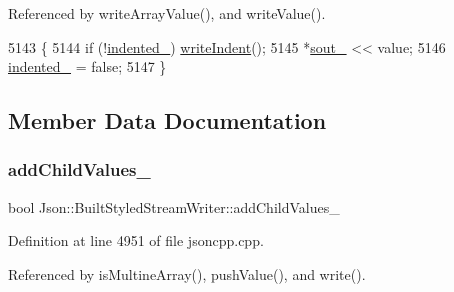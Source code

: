 Referenced by write\+Array\+Value(), and write\+Value().


\begin{DoxyCode}
5143                                                                          \{
5144   \textcolor{keywordflow}{if} (!\hyperlink{struct_json_1_1_built_styled_stream_writer_a6aa0ad023e623f600103631a6bca6d10}{indented\_}) \hyperlink{struct_json_1_1_built_styled_stream_writer_a2b38a3714d415c4bd3b4812897130f3d}{writeIndent}();
5145   *\hyperlink{class_json_1_1_stream_writer_a4f5603d4228a9fa46a42cb44e5234d9b}{sout\_} << value;
5146   \hyperlink{struct_json_1_1_built_styled_stream_writer_a6aa0ad023e623f600103631a6bca6d10}{indented\_} = \textcolor{keyword}{false};
5147 \}
\end{DoxyCode}


\subsection{Member Data Documentation}
\mbox{\label{struct_json_1_1_built_styled_stream_writer_abed9cc31da503b48798e7cea68c42e16}} 
\subsubsection{\texorpdfstring{add\+Child\+Values\+\_\+}{addChildValues\_}}
{\footnotesize\ttfamily bool Json\+::\+Built\+Styled\+Stream\+Writer\+::add\+Child\+Values\+\_\+\hspace{0.3cm}{\ttfamily [private]}}



Definition at line 4951 of file jsoncpp.\+cpp.



Referenced by is\+Multine\+Array(), push\+Value(), and write().

\mbox{\label{struct_json_1_1_built_styled_stream_writer_a47d562d7874c5b1e68995bd62f575792}} 
